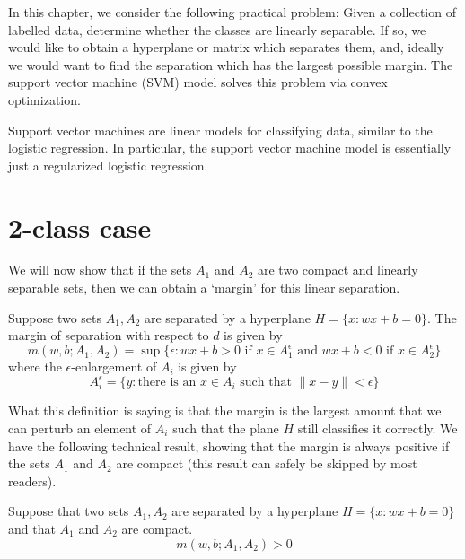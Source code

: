 In this chapter, we consider the following practical problem: Given a collection of labelled data, determine whether the
classes are linearly separable. If so, we would like to obtain a hyperplane or matrix which separates them, and, ideally
we would want to find the separation which has the largest possible margin. The support vector machine (SVM) model solves this
problem via convex optimization.

Support vector machines are linear models for classifying data,
similar to the logistic regression. In particular, the support vector
machine model is essentially just a regularized logistic regression.

\section{2-class case}

We will now show that if the sets $A_1$ and $A_2$ are two compact and
linearly separable sets, then we can obtain a `margin' for this linear
separation.

\begin{definition}\label{margin_two_class}
  Suppose two sets $A_1, A_2$ are separated by a hyperplane
  $H=\{x:wx+b=0\}$. The margin of separation with respect to $d$ is
  given by
 \begin{equation}
  m(w,b; A_1, A_2) = \sup \{\epsilon:\text{$wx+b>0$ if $x\in A^{\epsilon}_1$ and $wx+b<0$ if $x\in A^\epsilon_2$}\}
 \end{equation}
where the $\epsilon$-enlargement of $A_i$ is given by
\begin{equation}
 A^\epsilon_i = \{y:\text{there is an $x\in A_i$ such that $\|x-y\| < \epsilon$}\}
\end{equation}
\end{definition}

What this definition is saying is that the margin is the largest amount that we can perturb an element of $A_i$
such that the plane $H$ still classifies it correctly. 
We have the following technical result, showing that the margin is always positive if the sets $A_1$ and $A_2$ are
compact (this result can safely be skipped by most readers).

\begin{lemma}
  Suppose that two sets $A_1, A_2$ are separated by a hyperplane
  $H=\{x:wx+b=0\}$ and that $A_1$ and $A_2$ are compact.
 \begin{equation}
  m(w,b; A_1, A_2) > 0
 \end{equation}

\end{lemma}

